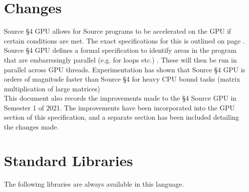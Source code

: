 





\section{Changes}

Source \S 4 GPU allows for Source programs to be accelerated on the GPU if certain conditions are met.
The exact specifications for this is outlined on page \pageref{gpu_supp}. Source \S 4 GPU  defines a formal specification 
to identify areas in the program that are embarrssingly parallel (e.g. for loops etc.) . These will then
be run in parallel across GPU threads. Experimentation has shown that Source \S 4 GPU is orders of magnitude faster
than Source \S 4 for heavy CPU bound tasks (matrix multiplication of large matrices)\\

This document also records the improvements made to the \S 4 Source GPU in Semester 1 of 2021. The improvements have been incorporated into the GPU section of this specification, and a separate section has been included detailing the changes made.






\newpage





















\section{Standard Libraries}

The following libraries are always available in this language.

